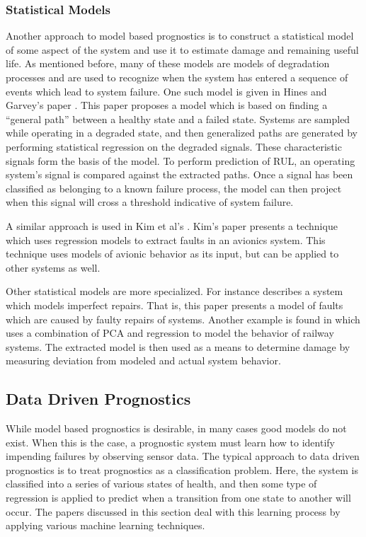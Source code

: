 \documentclass[12pt]{article}
\begin{document}
\subsubsection{Statistical Models}
Another approach to model based prognostics is to construct a
statistical model of some aspect of the system and use it to estimate
damage and remaining useful life.  As mentioned before, many of these
models are models of degradation processes and are used to recognize
when the system has entered a sequence of events which lead to system
failure.  One such model is given in Hines and Garvey's paper
\cite{4925841}.  This paper proposes a model which is based on finding
a ``general path'' between a healthy state and a failed state.
Systems are sampled while operating in a degraded state, and then
generalized paths are generated by performing statistical regression
on the degraded signals.  These characteristic signals form the basis
of the model.  To perform prediction of RUL, an operating system's
signal is compared against the extracted paths.  Once a signal has
been classified as belonging to a known failure process, the model can
then project when this signal will cross a threshold indicative of
system failure.

A similar approach is used in Kim et al's \cite{5747564}. Kim's paper
presents a technique which uses regression models to extract faults in
an avionics system.  This technique uses models of avionic behavior as
its input, but can be applied to other systems as well.

Other statistical models are more specialized.  For instance
\cite{6228962} describes a system which models imperfect repairs.
That is, this paper presents a model of faults which are caused by
faulty repairs of systems.  Another example is found in \cite{6299533}
which uses a combination of PCA and regression to model the behavior
of railway systems.  The extracted model is then used as a means to
determine damage by measuring deviation from modeled and actual system
behavior.

\subsection{Data Driven Prognostics}
While model based prognostics is desirable, in many cases good models
do not exist. When this is the case, a prognostic system must learn
how to identify impending failures by observing sensor data. The
typical approach to data driven prognostics is to treat prognostics as
a classification problem. Here, the system is classified into a series
of various states of health, and then some type of regression is
applied to predict when a transition from one state to another will
occur. The papers discussed in this section deal with this learning
process by applying various machine learning techniques.
\end{document}
